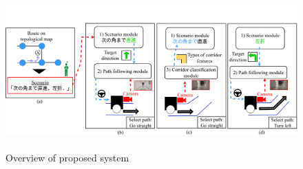 \documentclass{sice-si}
\begin{document}
\begin{figure}[t]
    \centering
     \includegraphics[height=60mm,width=160mm]{./figs/absv3.pdf}
     \caption{Overview of proposed system}\label{fig:system}
\end{figure}
\end{document}
